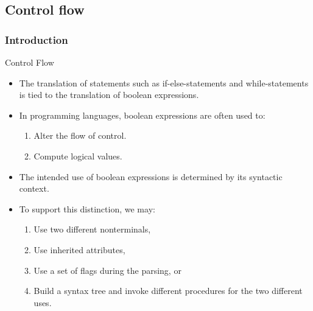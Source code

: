 \begin{bibunit}[apalike]
\tableofcontentslide[sections={3-},sectionstyle={show/shaded},subsectionstyle={show/show/hide},subsubsectionstyle={hide/hide/hide/hide}]

\subsection{Control flow}

\subsubsection{Introduction}

\tableofcontentslide[sections={3-},sectionstyle={show/shaded},subsectionstyle={show/shaded/hide},subsubsectionstyle={show/show/hide/hide}]

\begin{frame}{Control Flow}
	\begin{itemize}
	\item The translation of statements such as if-else-statements and while-statements is tied to the translation of boolean expressions.
	\item In programming languages, boolean expressions are often used to:
		\begin{enumerate}
		\item Alter the flow of control.
		\item Compute logical values.
		\end{enumerate}
	\item The intended use of boolean expressions is determined by its syntactic context.
	\item To support this distinction, we may:
		\begin{enumerate}
		\item Use two different nonterminals,
		\item Use inherited attributes,
		\item Use a set of flags during the parsing, or
		\item Build a syntax tree and invoke different procedures for the two different uses.
		\end{enumerate}
	\end{itemize}
\end{frame}


\end{bibunit}
